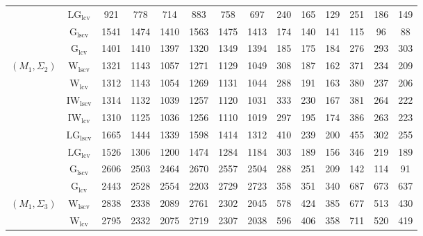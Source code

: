 \begin{table}[!ht]
{\begin{tabular}{@{}cc|ccc|ccc|ccc|ccc@{}}
 & $\mathrm{LG}_{\mathrm{lcv}}$ & 921 & 778 & 714 & 883 & 758 & 697 & 240 & 165 & 129 & 251 & 186 & \cellcolor{black!10}149 \\ 
 & $\mathrm{G}_{\mathrm{lscv}}$ & 1541 & 1474 & 1410 & 1563 & 1475 & 1413 & \cellcolor{black!30}174 & 140 & 141 & \cellcolor{black!30}115 & \cellcolor{black!30}96 & \cellcolor{black!30}88 \\ 
 & $\mathrm{G}_{\mathrm{lcv}}$ & 1401 & 1410 & 1397 & 1320 & 1349 & 1394 & \cellcolor{black!10}185 & 175 & 184 & 276 & 293 & 303 \\ 
\midrule
$(M_1,\Sigma_2)$ & $\mathrm{W}_{\mathrm{lscv}}$ & 1321 & 1143 & 1057 & 1271 & 1129 & 1049 & 308 & \cellcolor{black!30}187 & \cellcolor{black!10}162 & 371 & 234 & 209 \\ 
 & $\mathrm{W}_{\mathrm{lcv}}$ & \cellcolor{black!10}1312 & 1143 & 1054 & 1269 & 1131 & 1044 & \cellcolor{black!10}288 & 191 & 163 & 380 & 237 & 206 \\ 
 & $\mathrm{IW}_{\mathrm{lscv}}$ & 1314 & \cellcolor{black!10}1132 & \cellcolor{black!10}1039 & \cellcolor{black!10}1257 & \cellcolor{black!10}1120 & \cellcolor{black!10}1031 & 333 & 230 & 167 & 381 & 264 & 222 \\ 
 & $\mathrm{IW}_{\mathrm{lcv}}$ & \cellcolor{black!30}1310 & \cellcolor{black!30}1125 & \cellcolor{black!30}1036 & \cellcolor{black!30}1256 & \cellcolor{black!30}1110 & \cellcolor{black!30}1019 & 297 & 195 & 174 & 386 & 263 & 223 \\ 
 & $\mathrm{LG}_{\mathrm{lscv}}$ & 1665 & 1444 & 1339 & 1598 & 1414 & 1312 & 410 & 239 & 200 & 455 & 302 & 255 \\ 
 & $\mathrm{LG}_{\mathrm{lcv}}$ & 1526 & 1306 & 1200 & 1474 & 1284 & 1184 & 303 & \cellcolor{black!10}189 & \cellcolor{black!30}156 & \cellcolor{black!10}346 & \cellcolor{black!10}219 & \cellcolor{black!10}189 \\ 
 & $\mathrm{G}_{\mathrm{lscv}}$ & 2606 & 2503 & 2464 & 2670 & 2557 & 2504 & \cellcolor{black!30}288 & 251 & 209 & \cellcolor{black!30}142 & \cellcolor{black!30}114 & \cellcolor{black!30}91 \\ 
 & $\mathrm{G}_{\mathrm{lcv}}$ & 2443 & 2528 & 2554 & 2203 & 2729 & 2723 & 358 & 351 & 340 & 687 & 673 & 637 \\ 
\midrule
$(M_1,\Sigma_3)$ & $\mathrm{W}_{\mathrm{lscv}}$ & 2838 & 2338 & 2089 & 2761 & 2302 & 2045 & 578 & 424 & 385 & 677 & 513 & 430 \\ 
 & $\mathrm{W}_{\mathrm{lcv}}$ & 2795 & 2332 & 2075 & 2719 & 2307 & 2038 & 596 & 406 & 358 & 711 & 520 & 419 \\ 

\end{tabular}}
\end{table}
